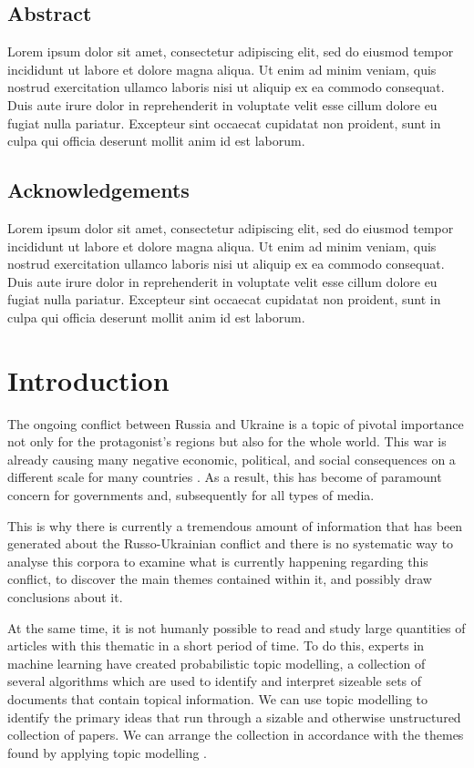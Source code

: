 \documentclass[twoside,11pt,a4paper]{article}
\begin{document}
\subsection{Abstract}
Lorem ipsum dolor sit amet, consectetur adipiscing elit, sed do eiusmod tempor incididunt ut labore et dolore magna aliqua. Ut enim ad minim veniam, quis nostrud exercitation ullamco laboris nisi ut aliquip ex ea commodo consequat. Duis aute irure dolor in reprehenderit in voluptate velit esse cillum dolore eu fugiat nulla pariatur. Excepteur sint occaecat cupidatat non proident, sunt in culpa qui officia deserunt mollit anim id est laborum.

\subsection{Acknowledgements}
Lorem ipsum dolor sit amet, consectetur adipiscing elit, sed do eiusmod tempor incididunt ut labore et dolore magna aliqua. Ut enim ad minim veniam, quis nostrud exercitation ullamco laboris nisi ut aliquip ex ea commodo consequat. Duis aute irure dolor in reprehenderit in voluptate velit esse cillum dolore eu fugiat nulla pariatur. Excepteur sint occaecat cupidatat non proident, sunt in culpa qui officia deserunt mollit anim id est laborum.

\clearpage
\section{Introduction}
The ongoing conflict between Russia and Ukraine is a topic of pivotal importance not only for the protagonist's regions but also for the whole world. This war is already causing many negative economic, political, and social consequences on a different scale for many countries \citep{caldara_effect_2022}. As a result, this has become of paramount concern for governments and, subsequently for all types of media.

This is why there is currently a tremendous amount of information that has been generated about the Russo-Ukrainian conflict and there is no systematic way to analyse this corpora to examine what is currently happening regarding this conflict, to discover the main themes contained within it, and possibly draw conclusions about it.

At the same time, it is not humanly possible to read and study large quantities of articles with this thematic in a short period of time. To do this, experts in machine learning have created probabilistic topic modelling, a collection of several algorithms which are used to identify and interpret sizeable sets of documents that contain topical information. We can use topic modelling to identify the primary ideas that run through a sizable and otherwise unstructured collection of papers. We can arrange the collection in accordance with the themes found by applying topic modelling \citep{blei_probabilistic_2012}.
\end{document}
